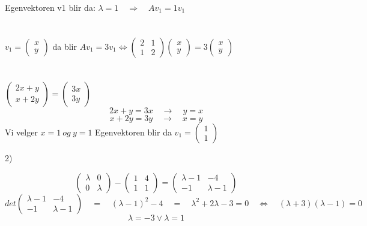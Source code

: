 \documentclass{article}
\begin{document}
Egenvektoren v1 blir da: 
\(\lambda = 1 \quad \Rightarrow \quad Av_1 = 1v_1\)
\\ \\ \\
\(v_1 = \begin{pmatrix}
    x \\ y
\end{pmatrix} 
\)
da blir 
\(Av_1 = 3v_1 \Leftrightarrow \begin{pmatrix}
    2 & 1 \\ 1 & 2
\end{pmatrix}\begin{pmatrix}
    x \\ y
\end{pmatrix} = 3 \begin{pmatrix}
    x \\ y
\end{pmatrix}\)
\\ \\ \\
\(\begin{pmatrix}
    2x + y \\ x + 2y
\end{pmatrix} = \begin{pmatrix}
    3x \\ 3y
\end{pmatrix}\)
\[2x + y = 3x \quad \rightarrow \quad y = x\]
\[x + 2y = 3y \quad \rightarrow \quad x = y\]
Vi velger \(x = 1 \ og \ y = 1\)
Egenvektoren blir da \(v_1 = \begin{pmatrix}
    1 \\ 1
\end{pmatrix}\)

\newpage

2)

\[ 
\begin{pmatrix}
    \lambda & 0 \\ 0 & \lambda
\end{pmatrix} -
\begin{pmatrix}
    1 & 4 \\ 1 & 1
\end{pmatrix} = \begin{pmatrix}
    \lambda - 1 & -4 \\ -1 & \lambda - 1
\end{pmatrix}\] 
\[det\begin{pmatrix}
    \lambda -1 & -4 \\ -1 & \lambda -1
\end{pmatrix} \quad = \quad (\lambda - 1)^2 - 4 \quad = \quad \lambda^2+2\lambda -3 = 0 \quad \Leftrightarrow \quad (\lambda+3)(\lambda-1) = 0\]
\[\lambda = -3 \vee \lambda = 1\]
\end{document}
